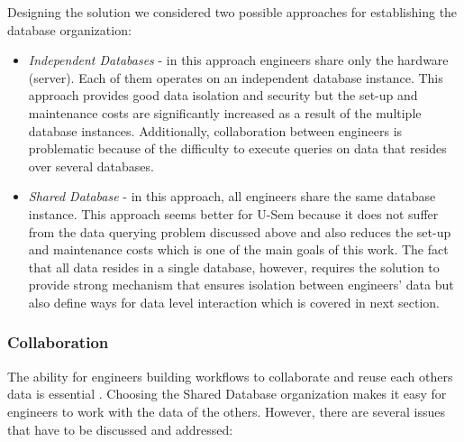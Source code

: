 Designing the solution we considered two possible approaches for establishing the database organization:

\begin{itemize}

\item \textit{Independent Databases} - in this approach engineers share only the hardware (server). Each of them operates on an independent database instance. This approach provides good data isolation and security but the set-up and maintenance costs are significantly increased as a result of the multiple database instances. Additionally, collaboration between engineers is problematic because of the difficulty to execute queries on data that resides over several databases.  
	
\item \textit{Shared Database} - in this approach, all engineers share the same database instance. This approach seems better for U-Sem because it does not suffer from the data querying problem discussed above and also reduces the set-up and maintenance costs which is one of the main goals of this work. The fact that all data resides in a single database, however, requires the solution to provide strong mechanism that ensures isolation between engineers' data but also define ways for data level interaction which is covered in next section.

\end{itemize}


\subsubsection{Collaboration}
The ability for engineers building workflows to collaborate and reuse each others data is essential \cite{lu2009collaborative}. Choosing the Shared Database organization makes it easy for engineers to work with the data of the others. However, there are several issues that have to be discussed and addressed:

